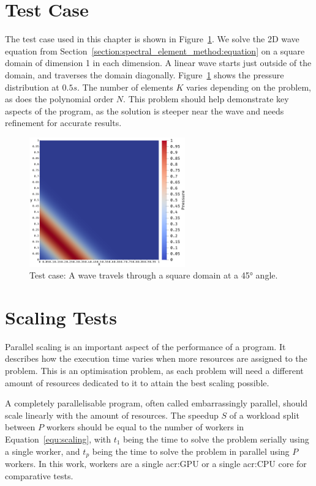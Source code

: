 \section{Test Case}\label{section:results:test_case}

The test case used in this chapter is shown in Figure~\ref{fig:problem}. We solve the 2D wave
equation from Section~\ref{section:spectral_element_method:equation} on a square domain of dimension
1 in each dimension. A linear wave starts just outside of the domain, and traverses the domain
diagonally. Figure~\ref{fig:problem} shows the pressure distribution at \(0.5 s\). The number of
elements \( K \) varies depending on the problem, as does the polynomial order \( N \). This problem
should help demonstrate key aspects of the program, as the solution is steeper near the wave and
needs refinement for accurate results.

\begin{figure}[H]
	\centering
	\includegraphics[width=0.6\textwidth]{Chapter_results/media/problem_1}
	\caption{Test case: A wave travels through a square domain at a 45° angle.}\label{fig:problem}
\end{figure}

\section{Scaling Tests}\label{section:results:scaling_tests}

Parallel scaling is an important aspect of the performance of a program. It describes how the
execution time varies when more resources are assigned to the problem. This is an optimisation
problem, as each problem will need a different amount of resources dedicated to it to attain the
best scaling possible. 

A completely parallelisable program, often called embarrassingly parallel, should scale linearly
with the amount of resources. The speedup \(S\) of a workload split between \(P\) workers should be
equal to the number of workers in Equation~\ref{equ:scaling}, with \(t_1\) being the time to solve
the problem serially using a single worker, and \(t_p\) being the time to solve the problem in
parallel using \(P\) workers. In this work, workers are a single \acrshort{acr:GPU} or a single
\acrshort{acr:CPU} core for comparative tests.

